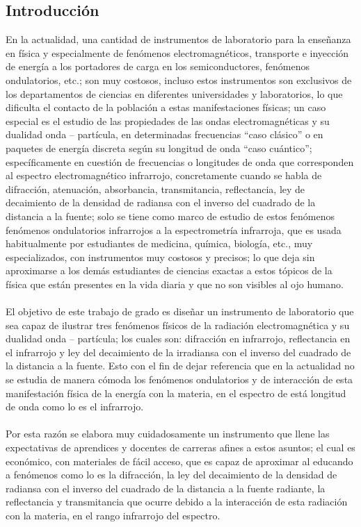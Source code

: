 \documentclass[12]{article}
\begin{document}
\begin{multicols}{2}
\section{Introducción}
En la actualidad, una cantidad de instrumentos de laboratorio para la enseñanza en física y especialmente de  fenómenos electromagnéticos,  transporte e inyección de energía a los portadores de carga en los semiconductores, fenómenos ondulatorios, etc.; son  muy costosos, incluso estos instrumentos son exclusivos de los departamentos de ciencias en diferentes  universidades y laboratorios, lo que dificulta el contacto de la población a estas manifestaciones físicas; un caso especial es el estudio de las propiedades de las ondas electromagnéticas y su dualidad onda – partícula, en determinadas frecuencias “caso clásico” o en paquetes de energía discreta según su longitud de onda “caso cuántico”; específicamente en cuestión de frecuencias o longitudes de onda que corresponden al espectro electromagnético infrarrojo, concretamente cuando se habla de difracción, atenuación, absorbancia, transmitancia, reflectancia,   ley de decaimiento de la densidad de radiansa con el inverso del cuadrado de la distancia a la fuente; solo se tiene como marco de estudio de estos fenómenos fenómenos ondulatorios infrarrojos a la espectrometría  infrarroja, que es usada habitualmente por estudiantes de medicina, química, biología, etc., muy especializados, con instrumentos muy costosos y precisos;  lo que deja sin aproximarse a los demás estudiantes de ciencias exactas a estos tópicos de la física que están presentes en la vida diaria y que no son visibles al ojo humano.\\\\
El objetivo de este trabajo de grado es diseñar un instrumento de laboratorio que sea capaz de ilustrar tres  fenómenos físicos  de la radiación electromagnética y su dualidad onda – partícula; los cuales son: difracción en infrarrojo, reflectancia en el infrarrojo y ley del decaimiento de la irradiansa con el inverso del cuadrado de la distancia a la fuente. Esto con el fin de dejar  referencia que en la actualidad no se estudia de manera cómoda los fenómenos ondulatorios y de interacción de esta manifestación física de la energía con la materia, en el espectro de está longitud de onda como lo es el infrarrojo. \\\\
Por esta razón se elabora muy cuidadosamente un instrumento que llene las expectativas de aprendices y docentes de carreras afines a  estos asuntos;  el cual es económico, con materiales de fácil acceso, que es capaz de aproximar al educando a fenómenos como lo es la difracción, la ley del decaimiento de  la densidad de radiansa con el inverso del cuadrado de la distancia a la fuente radiante,  la reflectancia y  transmitancia que ocurre debido a la interacción de esta radiación con la materia, en el rango infrarrojo del espectro.  \\\\

\end{multicols}
\end{document}
